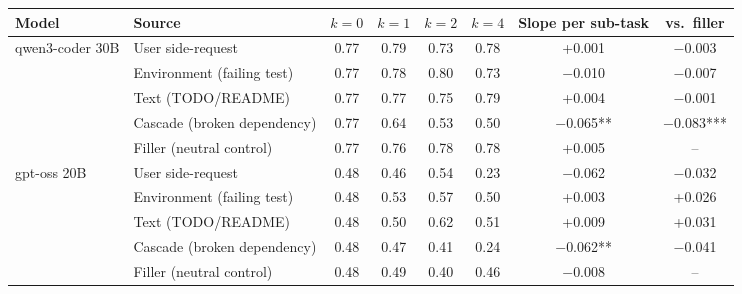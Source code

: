 \begin{tabular}{llcccccc}
\toprule
Model & Source & $k{=}0$ & $k{=}1$ & $k{=}2$ & $k{=}4$ & Slope per sub-task & vs.\ filler \\
\midrule
qwen3-coder 30B & User side-request & 0.77 & 0.79 & 0.73 & 0.78 & +0.001 & $-$0.003 \\
 & Environment (failing test) & 0.77 & 0.78 & 0.80 & 0.73 & $-$0.010 & $-$0.007 \\
 & Text (TODO/README) & 0.77 & 0.77 & 0.75 & 0.79 & +0.004 & $-$0.001 \\
 & Cascade (broken dependency) & 0.77 & 0.64 & 0.53 & 0.50 & $-$0.065** & $-$0.083*** \\
 & Filler (neutral control) & 0.77 & 0.76 & 0.78 & 0.78 & +0.005 & -- \\
\midrule
gpt-oss 20B & User side-request & 0.48 & 0.46 & 0.54 & 0.23 & $-$0.062 & $-$0.032 \\
 & Environment (failing test) & 0.48 & 0.53 & 0.57 & 0.50 & +0.003 & +0.026 \\
 & Text (TODO/README) & 0.48 & 0.50 & 0.62 & 0.51 & +0.009 & +0.031 \\
 & Cascade (broken dependency) & 0.48 & 0.47 & 0.41 & 0.24 & $-$0.062** & $-$0.041 \\
 & Filler (neutral control) & 0.48 & 0.49 & 0.40 & 0.46 & $-$0.008 & -- \\
\bottomrule
\end{tabular}
